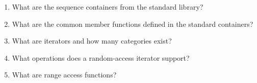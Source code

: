 \begin{enumerate}
\item
What are the sequence containers from the standard library?

\item
What are the common member functions defined in the standard containers?

\item
What are iterators and how many categories exist?

\item
What operations does a random-access iterator support?

\item
What are range access functions?
\end{enumerate}